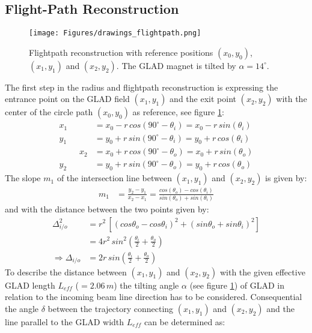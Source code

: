 \begin{appendices}
\section{Flight-Path Reconstruction}\label{app:flightpath}
\begin{figure}[h!]
    \centering
    \texttt{[image: Figures/drawings\_flightpath.png]}
    \caption{
        Flightpath reconstruction with reference positions $(x_0,y_0)$, $(x_1,y_1)$ and $(x_2,y_2)$. The GLAD magnet is tilted by $\alpha = 14^{\circ}$.}
    \label{fig:draw_flight}
\end{figure}
The first step in the radius and flightpath reconstruction is expressing the entrance point on the GLAD field $(x_1,y_1)$ and the exit point $(x_2,y_2)$ with the center of the circle path $(x_0,y_0)$ as reference, see figure \ref{fig:draw_flight}:
\begin{align*}
x_1 &= x_0 -r\,cos(90^{\circ}-\theta_i) = x_0 -r\,sin(\theta_i)\\
y_1 &= y_0 + r\,sin(90^{\circ}-\theta_i) = y_0 + r\,cos(\theta_i)\\
\hspace{1cm}
x_2 &= x_0 + r\,cos(90^{\circ}-\theta_o) = x_0 + r\,sin(\theta_o)\\
y_2 &= y_0 + r\,sin(90^{\circ}-\theta_o) = y_0 + r\,cos(\theta_o) 
\end{align*}
The slope $m_1$ of the intersection line between $(x_1,y_1)$ and $(x_2,y_2)$ is given by:
\begin{align*}
m_1 &= \frac{y_2-y_1}{x_2 -x_1} = \frac{cos(\theta_o) - cos(\theta_i)}{sin(\theta_o)+sin(\theta_i)}
\end{align*}
and with the distance between the two points given by:
\begin{align*}
\Delta^2_{i/o} &= r^2 \, \left[(cos\theta_o - cos\theta_i)^2 + (sin\theta_o + sin\theta_i)^2 \right]\\
	       &= 4r^2\,sin^2(\frac{\theta_i}{2} +\frac{\theta_o}{2} )\\
\Rightarrow \Delta_{i/o} &= 2r\,sin(\frac{\theta_i}{2} +\frac{\theta_o}{2})
\end{align*}
To describe the distance between $(x_1,y_1)$ and $(x_2,y_2)$ with the given effective GLAD length $L_{eff}$ ($= 2.06\,m$) the tilting angle $\alpha$ (see figure \ref{fig:draw_flight}) of GLAD in relation to the incoming beam line direction has to be considered. Consequential the angle $\delta$ between the trajectory connecting $(x_1,y_1)$ and $(x_2,y_2)$ and the line parallel to the GLAD width $L_{eff}$ can be determined as:

\end{appendices}
